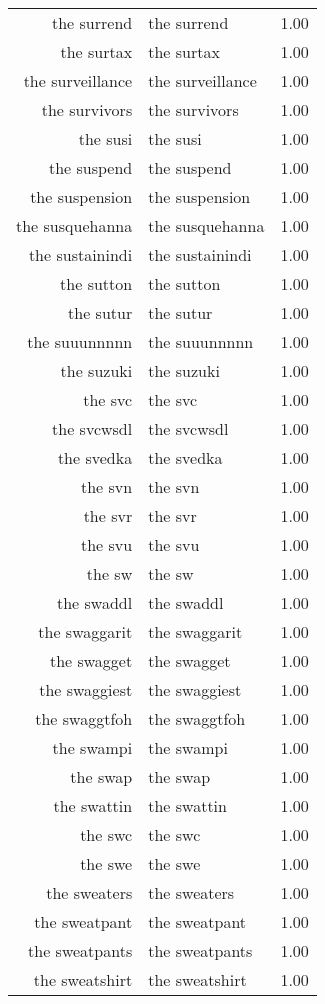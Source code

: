 \begin{table}[ht]
\begin{tabular}{rlr}
  the surrend & the surrend & 1.00 \\ 
  the surtax & the surtax & 1.00 \\ 
  the surveillance & the surveillance & 1.00 \\ 
  the survivors & the survivors & 1.00 \\ 
  the susi & the susi & 1.00 \\ 
  the suspend & the suspend & 1.00 \\ 
  the suspension & the suspension & 1.00 \\ 
  the susquehanna & the susquehanna & 1.00 \\ 
  the sustainindi & the sustainindi & 1.00 \\ 
  the sutton & the sutton & 1.00 \\ 
  the sutur & the sutur & 1.00 \\ 
  the suuunnnnn & the suuunnnnn & 1.00 \\ 
  the suzuki & the suzuki & 1.00 \\ 
  the svc & the svc & 1.00 \\ 
  the svcwsdl & the svcwsdl & 1.00 \\ 
  the svedka & the svedka & 1.00 \\ 
  the svn & the svn & 1.00 \\ 
  the svr & the svr & 1.00 \\ 
  the svu & the svu & 1.00 \\ 
  the sw & the sw & 1.00 \\ 
  the swaddl & the swaddl & 1.00 \\ 
  the swaggarit & the swaggarit & 1.00 \\ 
  the swagget & the swagget & 1.00 \\ 
  the swaggiest & the swaggiest & 1.00 \\ 
  the swaggtfoh & the swaggtfoh & 1.00 \\ 
  the swampi & the swampi & 1.00 \\ 
  the swap & the swap & 1.00 \\ 
  the swattin & the swattin & 1.00 \\ 
  the swc & the swc & 1.00 \\ 
  the swe & the swe & 1.00 \\ 
  the sweaters & the sweaters & 1.00 \\ 
  the sweatpant & the sweatpant & 1.00 \\ 
  the sweatpants & the sweatpants & 1.00 \\ 
  the sweatshirt & the sweatshirt & 1.00 \\ 

\end{tabular}
\end{table}
